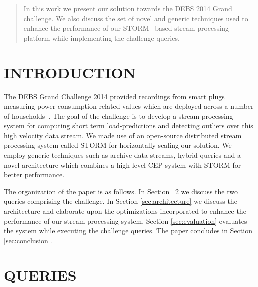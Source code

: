 \documentclass{sig-alternate}
\begin{document}
\date{07 March 2014}
\maketitle
\begin{abstract}
In this work we present our solution towards the DEBS 2014 Grand challenge. We also discuss the set of novel and generic techniques used to enhance the performance of our STORM~\cite{storm} based stream-processing platform while implementing the challenge queries.
\end{abstract}


\section{INTRODUCTION}
\label{sec:introduction}

The DEBS Grand Challenge 2014 provided recordings \linebreak from smart plugs measuring power consumption related values which are deployed across a number of households~\cite{ziekow2014challenge}. The goal of the challenge is to develop a stream-processing system for computing short term load-predictions and detecting outliers over this high velocity data stream. We made use of an open-source distributed stream processing system called STORM for horizontally scaling our solution. We employ generic techniques such as archive data streams, hybrid queries and a novel architecture which combines a high-level CEP system with STORM for better performance.

 The organization of the paper is as follows. In Section ~\ref{sec:queries} we discuss the two queries comprising the challenge. In Section \ref{sec:architecture} we discuss the architecture and elaborate upon the optimizations incorporated to enhance the performance of our stream-processing system. Section \ref{sec:evaluation} evaluates the system while executing the challenge queries. The paper concludes in Section \ref{sec:conclusion}.

\section{QUERIES}
\label{sec:queries}
\end{document}
